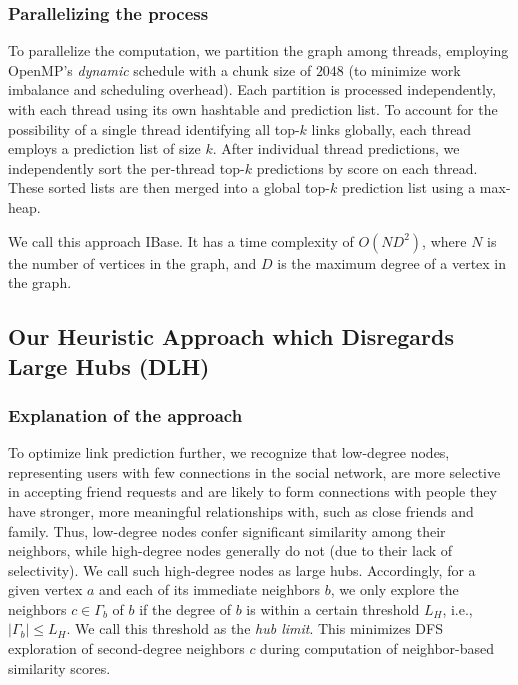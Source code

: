 \subsubsection{Parallelizing the process}

To parallelize the computation, we partition the graph among threads, employing OpenMP's \textit{dynamic} schedule with a chunk size of $2048$ (to minimize work imbalance and scheduling overhead). Each partition is processed independently, with each thread using its own hashtable and prediction list. To account for the possibility of a single thread identifying all top-$k$ links globally, each thread employs a prediction list of size $k$. After individual thread predictions, we independently sort the per-thread top-$k$ predictions by score on each thread. These sorted lists are then merged into a global top-$k$ prediction list using a max-heap.


We call this approach IBase. It has a time complexity of $O(ND^2)$, where $N$ is the number of vertices in the graph, and $D$ is the maximum degree of a vertex in the graph.




\subsection{Our Heuristic Approach which Disregards Large Hubs (DLH)}

\subsubsection{Explanation of the approach}

To optimize link prediction further, we recognize that low-degree nodes, representing users with few connections in the social network, are more selective in accepting friend requests and are likely to form connections with people they have stronger, more meaningful relationships with, such as close friends and family. Thus, low-degree nodes confer significant similarity among their neighbors, while high-degree nodes generally do not (due to their lack of selectivity). We call such high-degree nodes as large hubs. Accordingly, for a given vertex $a$ and each of its immediate neighbors $b$, we only explore the neighbors $c \in \Gamma_b$ of $b$ if the degree of $b$ is within a certain threshold $L_H$, i.e., $|\Gamma_b| \leq L_H$. We call this threshold as the \textit{hub limit}. This minimizes DFS exploration of second-degree neighbors $c$ during computation of neighbor-based similarity scores.

